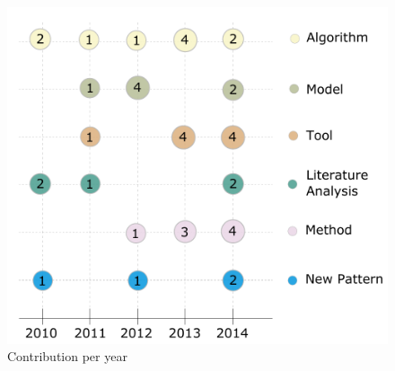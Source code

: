 

\begin{figure}[hbtp]
\centering
\includegraphics[scale=0.5]{figs/ContributionPerYear.pdf}
\caption{Contribution per year}
\label{fig:contribution-per-year}
\end{figure}

